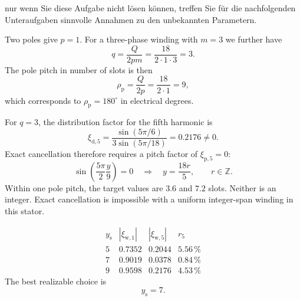 \begin{germanhintblock}
	nur wenn Sie diese Aufgabe nicht lösen können, treffen Sie für die nachfolgenden Unteraufgaben sinnvolle Annahmen zu den unbekannten Parametern.
\end{germanhintblock}

\begin{solutionblock}
	Two poles give $p=1$. For a three-phase winding with $m=3$ we further have
	$$
		q=\frac{Q}{2pm}=\frac{18}{2\cdot1\cdot3}=3.
	$$
	The pole pitch in number of slots is then
	$$
		\rho_\mathrm{p}=\frac{Q}{2p}=\frac{18}{2\cdot1}=9,
	$$
	which corresponds to $\rho_\mathrm{p}=180^\circ$ in electrical degrees.
\end{solutionblock}


\begin{solutionblock}
	For $q=3$, the distribution factor for the fifth harmonic is
	\[
		\xi_{\mathrm{d},5}
		=\frac{\sin(5\pi/6)}{3\sin(5\pi/18)}=0.2176\neq0.
	\]
	Exact cancellation therefore requires a pitch factor of $\xi_{\mathrm{p},5}=0$:
	\[
		\sin\!\left(\frac{5\pi}{2}\frac{y}{9}\right)=0
		\quad\Rightarrow\quad
		y=\frac{18r}{5},\qquad r\in\mathbb Z.
	\]
	Within one pole pitch, the target values are $3.6$ and $7.2$ slots. Neither is an integer. Exact cancellation is impossible with a uniform integer-span winding in this stator.
\end{solutionblock}

\begin{solutionblock}
	\[
		\begin{array}{c|c|c|c}
			y_{\mathrm{s}} & |\xi_{\mathrm{w},1}| & |\xi_{\mathrm{w},5}| & r_5      \\ \hline
			5              & 0.7352               & 0.2044               & 5.56\,\% \\
			7              & 0.9019               & 0.0378               & 0.84\,\% \\
			9              & 0.9598               & 0.2176               & 4.53\,\%
		\end{array}
	\]
	The best realizable choice is
	\[
		y_{\mathrm{s}}=7.
	\]
\end{solutionblock}

